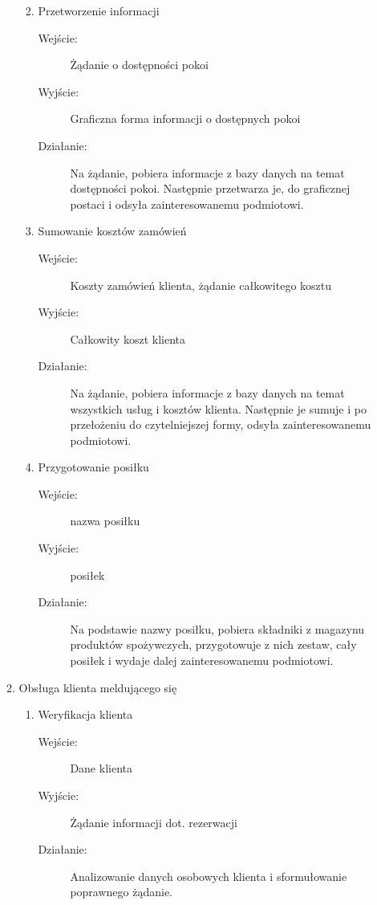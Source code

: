 \documentclass[a4paper, 11pt]{article}
\begin{document}
\begin{enumerate}[label*=\arabic*.]
\begin{enumerate}[label*=\arabic*.]
\begin{enumerate}[label*=\arabic*.]
\begin{description}
				\end{description}	
				\item Przetworzenie informacji
				\begin{description}
					\item[Wejście:] Żądanie o dostępności pokoi
					\item[Wyjście:] Graficzna forma informacji o dostępnych pokoi
					\item[Działanie:] Na żądanie, pobiera informacje z bazy danych na temat dostępności pokoi. Następnie przetwarza je, do graficznej postaci i odsyła zainteresowanemu podmiotowi.
				\end{description}	
				\item Sumowanie kosztów zamówień
				\begin{description}
					\item[Wejście:] Koszty zamówień klienta, żądanie całkowitego kosztu
					\item[Wyjście:] Całkowity koszt klienta
					\item[Działanie:] Na żądanie, pobiera informacje z bazy danych na temat wszystkich usług i kosztów klienta. Następnie je sumuje i po przełożeniu do czytelniejszej formy, odsyła zainteresowanemu podmiotowi.
				\end{description}	
				\item Przygotowanie posiłku
				\begin{description}
					\item[Wejście:] nazwa posiłku
					\item[Wyjście:] posiłek
					\item[Działanie:] Na podstawie nazwy posiłku, pobiera składniki z magazynu produktów spożywczych, przygotowuje z nich zestaw, cały posiłek i wydaje dalej zainteresowanemu podmiotowi.
				\end{description}	
			\end{enumerate}						
			\item Obsługa klienta meldującego się 
			\begin{enumerate}[label*=\arabic*.]
				\item Weryfikacja klienta
				\begin{description}
					\item[Wejście:] Dane klienta
					\item[Wyjście:] Żądanie informacji dot. rezerwacji
					\item[Działanie:] Analizowanie danych osobowych klienta i sformułowanie poprawnego żądanie.
				\end{description}	

\end{enumerate}
\end{enumerate}
\end{enumerate}
\end{document}
